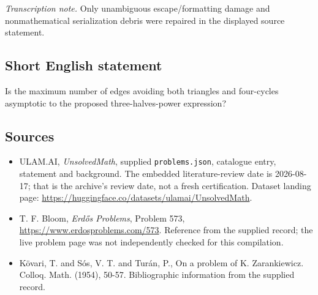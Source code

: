 \documentclass[11pt,a4paper]{article}
\begin{document}
{\small\emph{Transcription note.} Only unambiguous escape/formatting damage and nonmathematical serialization debris were repaired in the displayed source statement.}

\subsection{Short English statement}

Is the maximum number of edges avoiding both triangles and four-cycles asymptotic to the proposed three-halves-power expression?

\subsection{Sources}

{\small

\begin{itemize}

\item[\hypertarget{source:statement:1}{S1}] ULAM.AI, \emph{UnsolvedMath}, supplied \texttt{problems.json}, catalogue entry, statement and background. The embedded literature-review date is 2026-08-17; that is the archive’s review date, not a fresh certification. Dataset landing page: \url{https://huggingface.co/datasets/ulamai/UnsolvedMath}.

\item[\hypertarget{source:statement:2}{S2}] T. F. Bloom, \emph{Erdős Problems}, Problem 573, \url{https://www.erdosproblems.com/573}. Reference from the supplied record; the live problem page was not independently checked for this compilation.

\item[\hypertarget{source:statement:3}{S3}] K\"{o}vari, T. and S\'{o}s, V. T. and Tur\'{a}n, P., On a problem of K. Zarankiewicz. Colloq. Math. (1954), 50-57. Bibliographic information from the supplied record.

\end{itemize}

}

\label{end:statement}
\end{document}
